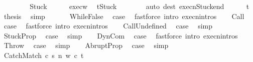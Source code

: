 \begin{isabellebody}
\ \ \isamarkupfalse%
\isanewline
\ \ \ \ \isamarkupfalse%
\ Stuck\isanewline
\ \ \ \ \isamarkupfalse%
\ exec{\isacharunderscore}w\ \isamarkupfalse%
\ {\isachardoublequoteopen}t{\isacharequal}Stuck{\isachardoublequoteclose}\isanewline
\ \ \ \ \ \ \isamarkupfalse%
\ {\isacharparenleft}auto\ dest{\isacharcolon}\ execn{\isacharunderscore}Stuck{\isacharunderscore}end{\isacharparenright}\isanewline
\ \ \ \ \isamarkupfalse%
\ t\ \isamarkupfalse%
\ {\isacharquery}thesis\ \isamarkupfalse%
\ simp\isanewline
\ \ \isamarkupfalse%
\isanewline
{}\isamarkupfalse%
\isanewline
\ \ \isamarkupfalse%
\ WhileFalse\ \isamarkupfalse%
\ {\isacharquery}case\ \isamarkupfalse%
\ {\isacharparenleft}fastforce\ intro{\isacharcolon}\ execn{\isachardot}intros{\isacharparenright}\isanewline
{}\isamarkupfalse%
\isanewline
\ \ \isamarkupfalse%
\ Call\ \isamarkupfalse%
\ {\isacharquery}case\ \isamarkupfalse%
\ {\isacharparenleft}fastforce\ intro{\isacharcolon}\ execn{\isachardot}intros{\isacharparenright}\isanewline
{}\isamarkupfalse%
\isanewline
\ \ \isamarkupfalse%
\ CallUndefined\ \isamarkupfalse%
\ {\isacharquery}case\ \isamarkupfalse%
\ simp\isanewline
{}\isamarkupfalse%
\isanewline
\ \ \isamarkupfalse%
\ StuckProp\ \isamarkupfalse%
\ {\isacharquery}case\ \isamarkupfalse%
\ simp\isanewline
{}\isamarkupfalse%
\isanewline
\ \ \isamarkupfalse%
\ DynCom\ \isamarkupfalse%
\ {\isacharquery}case\ \isamarkupfalse%
\ {\isacharparenleft}fastforce\ intro{\isacharcolon}\ execn{\isachardot}intros{\isacharparenright}\isanewline
{}\isamarkupfalse%
\isanewline
\ \ \isamarkupfalse%
\ Throw\ \isamarkupfalse%
\ {\isacharquery}case\ \isamarkupfalse%
\ simp\isanewline
{}\isamarkupfalse%
\isanewline
\ \ \isamarkupfalse%
\ AbruptProp\ \isamarkupfalse%
\ {\isacharquery}case\ \isamarkupfalse%
\ simp\isanewline
{}\isamarkupfalse%
\isanewline
\ \ \isamarkupfalse%
\ {\isacharparenleft}CatchMatch\ c{}\ s\ n\ w\ c{}\ t{\isacharparenright}\ \isanewline
\ \ \isamarkupfalse%

\end{isabellebody}
